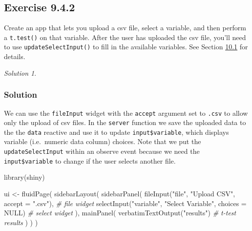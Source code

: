 \documentclass[
]{book}
\newenvironment{Shaded}{\begin{snugshade}}{\end{snugshade}}
\newcommand{\AttributeTok}[1]{\textcolor[rgb]{0.77,0.63,0.00}{#1}}
\newcommand{\CommentTok}[1]{\textcolor[rgb]{0.56,0.35,0.01}{\textit{#1}}}
\newcommand{\ConstantTok}[1]{\textcolor[rgb]{0.00,0.00,0.00}{#1}}
\newcommand{\FunctionTok}[1]{\textcolor[rgb]{0.00,0.00,0.00}{#1}}
\newcommand{\NormalTok}[1]{#1}
\newcommand{\OtherTok}[1]{\textcolor[rgb]{0.56,0.35,0.01}{#1}}
\newcommand{\StringTok}[1]{\textcolor[rgb]{0.31,0.60,0.02}{#1}}
\theoremstyle{definition}
\theoremstyle{definition}
\theoremstyle{definition}
\theoremstyle{definition}
\theoremstyle{remark}
\newtheorem*{solution}{Solution}
\begin{document}
\hypertarget{exercise-9.4.2}{%
\subsection*{Exercise 9.4.2}\label{exercise-9.4.2}}

Create an app that lets you upload a csv file, select a variable, and then
perform a \texttt{t.test()} on that variable. After the user has uploaded the csv
file, you'll need to use \texttt{updateSelectInput()} to fill in the available
variables. See Section
\href{https://mastering-shiny.org/action-dynamic.html\#updating-inputs}{10.1}
for details.

\begin{solution}
\leavevmode

\hypertarget{solution-26}{%
\subsubsection*{Solution}\label{solution-26}}

We can use the \texttt{fileInput} widget with the \texttt{accept} argument set to \texttt{.csv} to
allow only the upload of csv files. In the \texttt{server} function we save the
uploaded data to the the \texttt{data} reactive and use it to update \texttt{input\$variable},
which displays variable (i.e.~numeric data column) choices. Note that we put
the \texttt{updateSelectInput} within an observe event because we need the
\texttt{input\$variable} to change if the user selects another file.

\begin{Shaded}
\begin{Highlighting}[]
\FunctionTok{library}\NormalTok{(shiny)}

\NormalTok{ui }\OtherTok{\textless{}{-}} \FunctionTok{fluidPage}\NormalTok{(}
  \FunctionTok{sidebarLayout}\NormalTok{(}
    \FunctionTok{sidebarPanel}\NormalTok{(}
      \FunctionTok{fileInput}\NormalTok{(}\StringTok{"file"}\NormalTok{, }\StringTok{"Upload CSV"}\NormalTok{, }\AttributeTok{accept =} \StringTok{".csv"}\NormalTok{), }\CommentTok{\# file widget}
      \FunctionTok{selectInput}\NormalTok{(}\StringTok{"variable"}\NormalTok{, }\StringTok{"Select Variable"}\NormalTok{, }\AttributeTok{choices =} \ConstantTok{NULL}\NormalTok{) }\CommentTok{\# select widget}
\NormalTok{    ),}
    \FunctionTok{mainPanel}\NormalTok{(}
      \FunctionTok{verbatimTextOutput}\NormalTok{(}\StringTok{"results"}\NormalTok{) }\CommentTok{\# t{-}test results}
\NormalTok{    )}
\NormalTok{  )}
\NormalTok{)}


\end{Highlighting}
\end{Shaded}
\end{solution}
\end{document}
